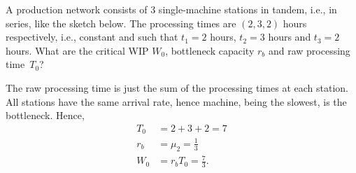 \begin{exercise}
  A production network consists of 3 single-machine stations in
  tandem, i.e., in series, like the sketch below.  The
  processing times are $(2, 3, 2)$ hours respectively, i.e., constant
  and such that $t_1=2$ hours, $t_2=3$ hours and $t_3=2$ hours.
What are the critical WIP $W_0$, bottleneck
  capacity $r_b$ and raw processing time~$T_0$?

    \centering

  \begin{solution} 
    The raw processing time is just the sum of the processing times at
    each station. All stations have the same arrival rate, hence
    machine, being the slowest, is the bottleneck. Hence,
 \begin{align*}
      T_0 &= 2 + 3 + 2 = 7\\
   r_b &= \mu_2 = \frac13 \\
      W_0 &= r_b T_0 = \frac73.
    \end{align*}
  \end{solution}
\end{exercise}

